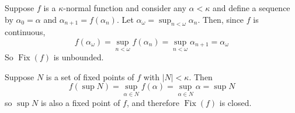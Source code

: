 \documentclass[12pt]{article}
\begin{document}
Suppose $f$ is a $\kappa$-normal function and consider any $\alpha<\kappa$ and define a sequence by $\alpha_0=\alpha$ and $\alpha_{n+1}=f(\alpha_n)$.  Let $\alpha_\omega=\sup_{n<\omega}\alpha_n$.  Then, since $f$ is continuous, $$f(\alpha_\omega)=\sup_{n<\omega} f(\alpha_n)=\sup_{n<\omega}\alpha_{n+1}=\alpha_\omega$$
So $\operatorname{Fix}(f)$ is unbounded.

Suppose $N$ is a set of fixed points of $f$ with $|N|<\kappa$.  Then $$f(\sup N)=\sup_{\alpha\in N} f(\alpha)=\sup_{\alpha\in N}\alpha=\sup N$$
so $\sup N$ is also a fixed point of $f$, and therefore $\operatorname{Fix}(f)$ is closed.
\end{document}
